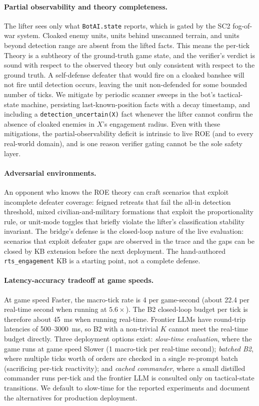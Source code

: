 \documentclass{article}
\theoremstyle{definition}
\begin{document}
\paragraph{Partial observability and theory completeness.} The lifter sees only what \texttt{BotAI.state} reports, which is gated by the SC2 fog-of-war system. Cloaked enemy units, units behind unscanned terrain, and units beyond detection range are absent from the lifted facts. This means the per-tick Theory is a subtheory of the ground-truth game state, and the verifier's verdict is sound with respect to the observed theory but only consistent with respect to the ground truth. A self-defense defeater that would fire on a cloaked banshee will not fire until detection occurs, leaving the unit non-defended for some bounded number of ticks. We mitigate by periodic scanner sweeps in the bot's tactical-state machine, persisting last-known-position facts with a decay timestamp, and including a \texttt{detection\_uncertain(X)} fact whenever the lifter cannot confirm the absence of cloaked enemies in $X$'s engagement radius. Even with these mitigations, the partial-observability deficit is intrinsic to live ROE (and to every real-world domain), and is one reason verifier gating cannot be the sole safety layer.

\paragraph{Adversarial environments.} An opponent who knows the ROE theory can craft scenarios that exploit incomplete defeater coverage: feigned retreats that fail the all-in detection threshold, mixed civilian-and-military formations that exploit the proportionality rule, or unit-mode toggles that briefly violate the lifter's classification stability invariant. The bridge's defense is the closed-loop nature of the live evaluation: scenarios that exploit defeater gaps are observed in the trace and the gaps can be closed by KB extension before the next deployment. The hand-authored \texttt{rts\_engagement} KB is a starting point, not a complete defense.

\paragraph{Latency-accuracy tradeoff at game speeds.} At game speed Faster, the macro-tick rate is 4 per game-second (about 22.4 per real-time second when running at $5.6\times$). The B2 closed-loop budget per tick is therefore about 45~ms when running real-time. Frontier LLMs have round-trip latencies of 500--3000~ms, so B2 with a non-trivial $K$ cannot meet the real-time budget directly. Three deployment options exist: \emph{slow-time evaluation}, where the game runs at game speed Slower (1 macro-tick per real-time second); \emph{batched B2}, where multiple ticks worth of orders are checked in a single re-prompt batch (sacrificing per-tick reactivity); and \emph{cached commander}, where a small distilled commander runs per-tick and the frontier LLM is consulted only on tactical-state transitions. We default to slow-time for the reported experiments and document the alternatives for production deployment.
\end{document}
